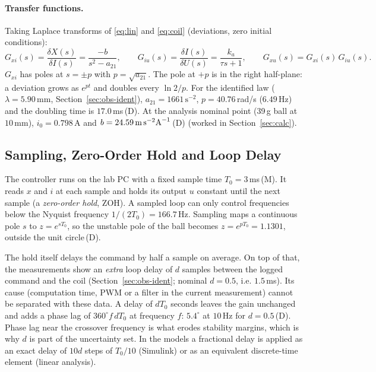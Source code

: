 \documentclass[11pt,a4paper]{article}
\newcommand{\st}[1]{\,\textup{(#1)}}
\begin{document}
\paragraph{Transfer functions.} Taking Laplace transforms of \eqref{eq:lin} and \eqref{eq:coil} (deviations, zero
initial conditions):
\begin{equation}
G_{xi}(s)=\frac{\delta X(s)}{\delta I(s)} = \frac{-b}{s^2 - a_{21}}, \qquad
G_{iu}(s)=\frac{\delta I(s)}{\delta U(s)} = \frac{k_a}{\tau s + 1}, \qquad
G_{xu}(s) = G_{xi}(s)\,G_{iu}(s).
\label{eq:tf}
\end{equation}
$G_{xi}$ has poles at $s=\pm p$ with $p=\sqrt{a_{21}}$. The pole at $+p$ is in the right half-plane: a deviation grows
as $e^{pt}$ and doubles every $\ln 2/p$. For the identified law ($\lambda = 5.90$\,mm, Section~\ref{sec:obs-ident}),
$a_{21}=1661\,\text{s}^{-2}$, $p=40.76$\,rad/s ($6.49$\,Hz) and the doubling time is $17.0$\,ms\st{D}. At the analysis
nominal point (39\,g ball at $10$\,mm), $i_0 = 0.798$\,A and $b = 24.59\,\text{m\,s}^{-2}\text{A}^{-1}$\st{D}
(worked in Section~\ref{sec:calc}).

\subsection{Sampling, Zero-Order Hold and Loop Delay}
\label{sec:th-delay}
The controller runs on the lab PC with a fixed sample time $T_0 = 3$\,ms\st{M}. It reads $x$ and $i$ at each sample
and holds its output $u$ constant until the next sample (a \emph{zero-order hold}, ZOH). A sampled loop can only
control frequencies below the Nyquist frequency $1/(2T_0)=166.7$\,Hz. Sampling maps a continuous pole $s$ to
$z=e^{sT_0}$, so the unstable pole of the ball becomes $z=e^{pT_0}=1.1301$, outside the unit circle\st{D}.

The hold itself delays the command by half a sample on average. On top of that, the measurements show an \emph{extra}
loop delay of $d$ samples between the logged command and the coil (Section~\ref{sec:obs-ident}; nominal $d=0.5$, i.e.
$1.5$\,ms). Its cause (computation time, PWM or a filter in the current measurement) cannot be separated with these
data. A delay of $dT_0$ seconds leaves the gain unchanged and adds a phase lag of $360^\circ f\,dT_0$ at frequency $f$:
$5.4^\circ$ at $10$\,Hz for $d=0.5$\st{D}. Phase lag near the crossover frequency is what erodes stability margins, which
is why $d$ is part of the uncertainty set. In the models a fractional delay is applied as an exact delay of
$10d$ steps of $T_0/10$ (Simulink) or as an equivalent discrete-time element (linear analysis).
\end{document}
